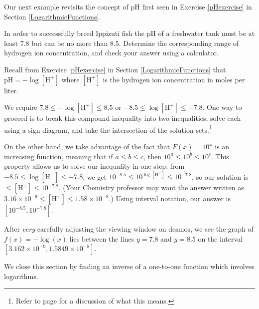 \documentclass{ximera}
\begin{document}
Our next example revisits the concept of pH first seen in Exercise \ref{pHexercise} in Section \ref{LogarithmicFunctions}.  


\begin{example}

In order to successfully breed Ippizuti fish the pH of a freshwater tank must be at least 7.8 but can be no more than 8.5.  Determine the corresponding range of hydrogen ion concentration, and check your answer using a calculator.



\begin{explanation}  Recall from Exercise \ref{pHexercise} in Section \ref{LogarithmicFunctions} that $\text{pH} = -\log[\text{H}^{+}]$ where $[\text{H}^{+}]$ is the hydrogen ion concentration in moles per liter.  

We require $7.8 \leq -\log[\text{H}^{+}] \leq 8.5$ or $-8.5 \leq   \log[\text{H}^{+}] \leq -7.8$.  One way to proceed is to break this compound inequality into two inequalities, solve each using a sign diagram, and take the intersection of the solution sets.\footnote{Refer to page \pageref{intersectionunion} for a discussion of what this means.}  

On the other hand, we take advantage of the fact that $F(x) = 10^{x}$ is an increasing function, meaning that if $a \leq b \leq c$, then $10^{a} \leq 10^{b} \leq 10^{c}$.  This property allows us to solve our inequality in one step: from $-8.5 \leq   \log[\text{H}^{+}] \leq -7.8$, we get   $10^{-8.5} \leq   10^{\log[\text{H}^{+}]} \leq 10^{-7.8}$, so our solution is $ \leq   [\text{H}^{+}] \leq 10^{-7.8}$.  (Your Chemistry professor may want the answer written as $3.16 \times 10^{-9} \leq [\text{H}^{+}] \leq 1.58 \times 10^{-8}$.)  Using interval notation, our answer is $\left[10^{-8.5}, 10^{-7.8}\right]$.   

After \textit{very} carefully adjusting the viewing window on desmos, we see the graph of $f(x) = -\log(x)$ lies between the lines $y = 7.8$ and $y = 8.5$ on the interval $[3.162 \times 10^{-9}, 1.5849 \times 10^{-8}]$.

\begin{center}
\end{center}
\end{explanation}
\end{example}



We close this section by finding an inverse of a one-to-one function which involves logarithms.
\end{document}
